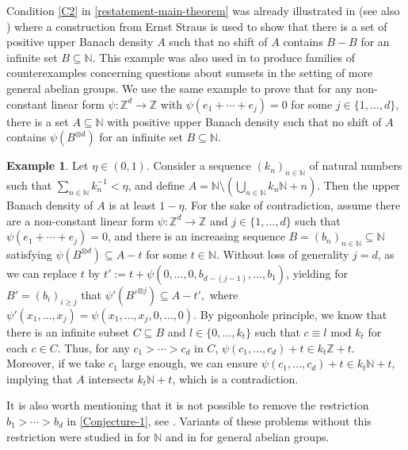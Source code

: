 \documentclass[letter,11pt]{article}
\theoremstyle{definition}
\newtheorem{ex}[theo]{Example}
\newcommand{\N}{\mathbb{N}}
\newcommand{\Z}{\mathbb{Z}}
\begin{document}
 Condition \ref{C2} in \cref{restatement-main-theorem} was already illustrated in \cite[cf. Theorem 2.20]{Beiglbock_Bergelson_Hindman_Strauss06} (see also \cite[Theorem 11.6]{Hindman1979}) where a construction from Ernst Straus is used to show that there is a set of positive upper Banach density $A$ such that no shift of $A$ contains $B-B$ for an infinite set $B\subseteq \N$. This example was also used in \cite{Kra_Moreira_Richter_Robertson:2023,kmrr2023problemsinfinitesumsetconfigurations,ackelsberg2024} to produce families of counterexamples concerning questions about sumsets in the setting of more general abelian groups. We use the same example to prove that for any non-constant linear form $\psi:\Z^d\to \Z$ with $\psi(e_1+\cdots+e_j)=0$ for some $j\in \{1,\ldots,d\}$, there is a set $A\subseteq \N$ with positive upper Banach density such that no shift of $A$ contains $\psi(B^{\otimes d})$ for an infinite set $B\subseteq \N$.
\begin{ex}\label{Straus-Example}
    Let $\eta\in (0,1)$. Consider a sequence $(k_n)_{n\in \N}$ of natural numbers such that $\sum_{n\in \N} k_n^{-1}<\eta$, and define $A=\N \setminus \left( \bigcup_{n\in \N} k_n\N + n\right)$. Then the upper Banach density of $A$ is at least $1-\eta$. For the sake of contradiction, assume there are a non-constant linear form $\psi:\Z^{d}\to \Z$ and $j\in \{1,\ldots,d\}$ such that $\psi(e_1+\cdots +e_j)=0$, and there is an increasing sequence $B=(b_n)_{n\in \N}\subseteq \N$ satisfying $\psi(B^{\otimes d})\subseteq A-t$ for some $t\in \N$. Without loss of generality $j=d$, as we can replace $t$ by $t':=t+\psi(0,\ldots,0,b_{d-(j-1)},\ldots,b_1)$, yielding for $B'=(b_{i})_{i\geq j}$ that $\psi'(B'^{\otimes j })\subseteq A-t',$ where $\psi'(x_1,\ldots,x_{j})= \psi(x_1,\ldots,x_{j},0, \ldots,0) $.
    By pigeonhole principle, we know that there is an infinite subset $C\subseteq B$ and $l\in \{0,\ldots, k_t\}$ such that $c\equiv l \text{ mod }k_t$ for each $c\in C$. Thus, for any $c_1>\cdots >c_d $ in $C$, $ \psi(c_1,\ldots,c_d)+t\in k_t\Z +t. $ Moreover, if we take $c_1$ large enough, we can ensure $\psi(c_1,\ldots,c_d)+t\in k_t\N +t$,
    implying that $A$ intersects $k_t\N+ t$, which is a contradiction.
\end{ex}

 It is also worth mentioning that it is not possible to remove the restriction $b_1>\cdots >b_d$ in \cref{Conjecture-1}, see \cite[Example 2.3]{kmrr2023problemsinfinitesumsetconfigurations}. Variants of these problems without this restriction were studied in \cite{kr24} for $\N$ and in \cite{ckmr25} for general abelian groups. 
\end{document}
